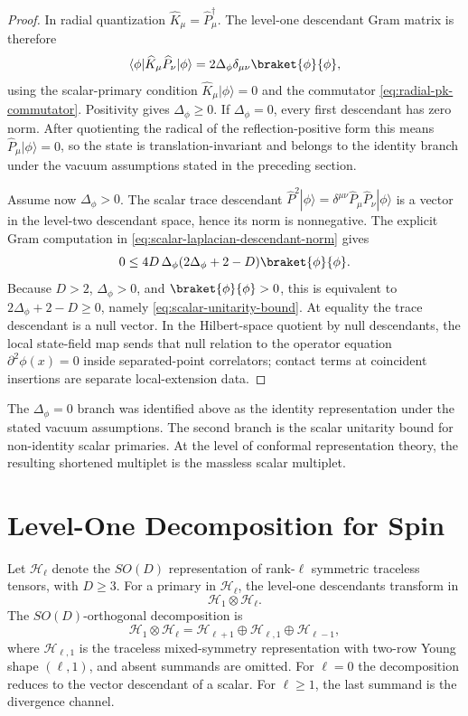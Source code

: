 \begin{proof}
In radial quantization \(\widehat K_\mu=\widehat P_\mu^\dagger\).  The
level-one descendant Gram matrix is therefore
\[
  \langle\phi|\widehat K_\mu\widehat P_\nu|\phi\rangle
  =
  2\Delta_\phi\delta_{\mu\nu}\braket{\phi}{\phi},
\]
using the scalar-primary condition \(\widehat K_\mu|\phi\rangle=0\) and the
commutator \eqref{eq:radial-pk-commutator}.  Positivity gives
\(\Delta_\phi\ge0\).  If \(\Delta_\phi=0\), every first descendant has zero
norm.  After quotienting the radical of the reflection-positive form this
means \(\widehat P_\mu|\phi\rangle=0\), so the state is translation-invariant
and belongs to the identity branch under the vacuum assumptions stated in the
preceding section.

Assume now \(\Delta_\phi>0\).  The scalar trace descendant
\(\widehat P^2|\phi\rangle=\delta^{\mu\nu}\widehat P_\mu\widehat P_\nu|\phi\rangle\)
is a vector in the level-two descendant space, hence its norm is nonnegative.
The explicit Gram computation in
\eqref{eq:scalar-laplacian-descendant-norm} gives
\[
  0
  \leq
  4D\,\Delta_\phi(2\Delta_\phi+2-D)\braket{\phi}{\phi}.
\]
Because \(D>2\), \(\Delta_\phi>0\), and \(\braket{\phi}{\phi}>0\), this is
equivalent to \(2\Delta_\phi+2-D\ge0\), namely
\eqref{eq:scalar-unitarity-bound}.  At equality the trace descendant is a
null vector.  In the Hilbert-space quotient by null descendants, the local
state-field map sends that null relation to the operator equation
\(\partial^2\phi(x)=0\) inside separated-point correlators; contact terms at
coincident insertions are separate local-extension data.
\end{proof}

The \(\Delta_\phi=0\) branch was identified above as the identity
representation under the stated vacuum assumptions.  The second branch is the
scalar unitarity bound for non-identity scalar primaries.
At the level of conformal representation theory, the resulting shortened
multiplet is the massless scalar multiplet.

\section{Level-One Decomposition for Spin}

Let \(\mathcal H_\ell\) denote the \(SO(D)\) representation of rank-\(\ell\)
symmetric traceless tensors, with \(D\ge3\).  For a primary in
\(\mathcal H_\ell\), the level-one descendants transform in
\[
  \mathcal H_1\otimes\mathcal H_\ell .
\]
The \(SO(D)\)-orthogonal decomposition is
\[
  \mathcal H_1\otimes\mathcal H_\ell
  =
  \mathcal H_{\ell+1}
  \oplus
  \mathcal H_{\ell,1}
  \oplus
  \mathcal H_{\ell-1},
\]
where \(\mathcal H_{\ell,1}\) is the traceless mixed-symmetry representation
with two-row Young shape \((\ell,1)\), and absent summands are omitted.  For
\(\ell=0\) the decomposition reduces to the vector descendant of a scalar.  For
\(\ell\ge1\), the last summand is the divergence channel.

